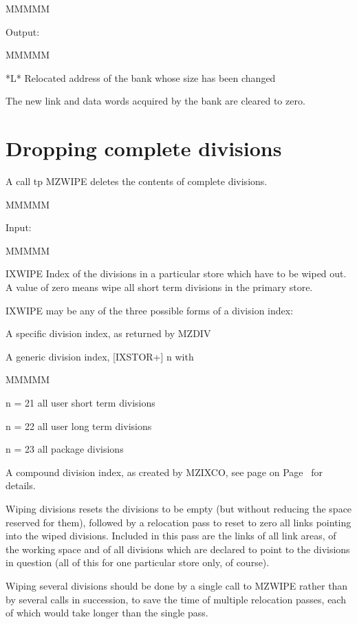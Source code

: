 \begin{DL}{MMMMM}
\item[Output:
]
\begin{DL}{MMMMM}
\item[*L*
]Relocated address of the bank whose size has been changed
\end{DL}
\end{DL}
\par The new link and data words acquired by the bank
are cleared to zero.
\section{Dropping complete divisions}
\par A call tp MZWIPE deletes the
contents of complete divisions.
\begin{DL}{MMMMM}
\item[Input:
]
\begin{DL}{MMMMM}
\item[IXWIPE
]Index of the divisions in a particular store which have
to be wiped out.
\newline A value of zero means wipe all short term divisions in the primary
store.
\end{DL}
\end{DL}
\par IXWIPE may be any of the three possible forms of a division index:
\begin{OL}
\item A specific division index, as returned by MZDIV
\item A generic division index, [IXSTOR+] n with
\begin{DL}{MMMMM}
\item[n = 21
]all user short term divisions
\item[n = 22
]all user long  term divisions
\item[n = 23
]all package divisions
\end{DL}
\item A compound division index, as created by MZIXCO,
see page on Page~\pageref{MZIXCO FORM=PAGEONLY} for details.
\end{OL}
Wiping divisions resets the divisions to be empty
(but without reducing the space reserved for them),
followed by a relocation pass to reset to zero all links
pointing into the wiped divisions.
Included in this pass are the links of all link areas,
of the working space and of all divisions which are declared
to point to the divisions in question
(all of this for one particular store only, of course).
\par Wiping several divisions should be done by a single call to MZWIPE
rather than by several calls in succession,
to save the time of multiple relocation passes,
each of which would take longer than the single pass.
